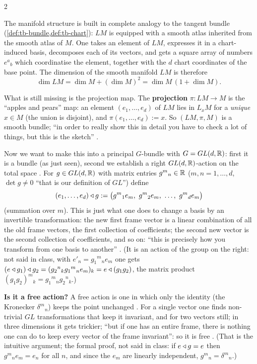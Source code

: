 \begin{paracol}{2}
\begin{aside}
\end{aside}
The manifold structure is built in complete analogy to the tangent bundle (\cref{def:tb-bundle,def:tb-chart}): $LM$ is equipped with a smooth atlas inherited from the smooth atlas of $M$. One takes an element of $LM$, expresses it in a chart-induced basis, decomposes each of its vectors, and gets a square array of numbers $e^a{}_b$ which coordinatise the element, together with the $d$ chart coordinates of the base point. The dimension of the smooth manifold $LM$ is therefore
\[
  \dim LM=\dim M+(\dim M)^2=\dim M\,(1+\dim M) .
\]
     

What is still missing is the projection map. The \textbf{projection} $\pi\colon LM\to M$ is the ``apples and pears'' map: an element $(e_1,\dots,e_d)$ of $LM$ lies in $L_xM$ for a \emph{unique} $x\in M$ (the union is disjoint), and $\pi(e_1,\dots,e_d):=x$. So $(LM,\pi,M)$ is a smooth bundle; ``in order to really show this in detail you have to check a lot of things, but this is the sketch''     .

Now we want to make this into a principal $G$-bundle with $G=GL(d,\mathbb{R})$: first it is a bundle (as just seen), second we establish a right $GL(d,\mathbb{R})$-action on the total space   . For $g\in GL(d,\mathbb{R})$ with matrix entries $g^m{}_n\in\mathbb{R}$ ($m,n=1,\dots,d$, $\det g\ne0$ ``that is our definition of $GL$'') define
\[
  (e_1,\dots,e_d)\mathbin{\triangleleft} g:=\bigl(g^m{}_1e_m,\ g^m{}_2e_m,\ \dots,\ g^m{}_de_m\bigr)
\]
(summation over $m$). This is just what one does to change a basis by an invertible transformation: the new first frame vector is a linear combination of all the old frame vectors, the first collection of coefficients; the second new vector is the second collection of coefficients, and so on: ``this is precisely how you transform from one basis to another''      . (It is an action of the group on the right: not said in class, with $e'_n=g_1{}^m{}_ne_m$ one gets $(e\mathbin{\triangleleft} g_1)\mathbin{\triangleleft} g_2=(g_2{}^n{}_kg_1{}^m{}_n e_m)_k=e\mathbin{\triangleleft}(g_1g_2)$, the matrix product $(g_1g_2)^m{}_k=g_1{}^m{}_ng_2{}^n{}_k$.)

\textbf{Is it a free action?} A free action is one in which only the identity (the Kronecker $\delta^m{}_n$) keeps the point unchanged  . For a single vector one finds non-trivial $GL$ transformations that keep it invariant, and for two vectors still; in three dimensions it gets trickier; ``but if one has an entire frame, there is nothing one can do to keep every vector of the frame invariant'': so it is free   . (That is the intuitive argument; the formal proof, not said in class: if $e\mathbin{\triangleleft} g=e$ then $g^m{}_ne_m=e_n$ for all $n$, and since the $e_m$ are linearly independent, $g^m{}_n=\delta^m{}_n$.)


\end{paracol}
